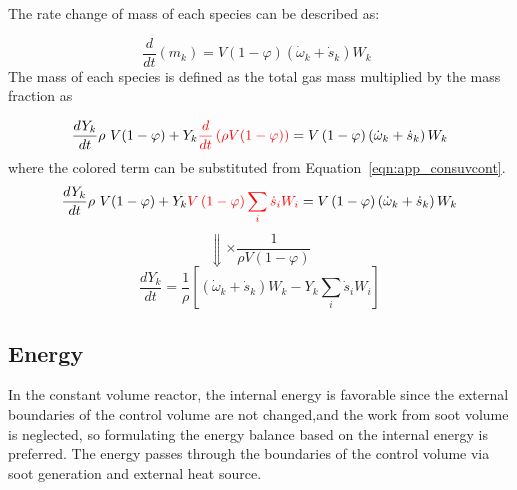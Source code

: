 The rate change of mass of each species can be described as:

\begin{equation*}
	\frac{d}{dt}\left(m_k\right)=V\left(1-\varphi\right)\left({\dot{\omega}}_k+{\dot{s}}_k\right)W_k\ \ 
\end{equation*}
The mass of each species is defined as the total gas mass multiplied by the mass fraction as

\begin{equation*}
	\frac{dY_k}{dt}\rho\ V(1-\varphi)
	+
	Y_k\color{red}{\frac{d}{dt}\left(\rho V(1-\varphi)\right)}
	\color{black}
	=
	V\left(1-\varphi\right)\left({\dot{\omega}}_k+{\dot{s}}_k\right)W_k
\end{equation*}
where the colored term can be substituted from Equation~\eqref{eqn:app_consuvcont}.
\begin{equation*}
	\frac{dY_k}{dt}\rho\ V(1-\varphi)
	+
	Y_k\color{red}{V\left(1-\varphi\right)\sum_{i}{{\dot{s}}_iW_i}}
	\color{black}
	=
	V\left(1-\varphi\right)\left({\dot{\omega}}_k+{\dot{s}}_k\right)W_k
\end{equation*}
\begin{equation*}
	\Downarrow \times \frac{1}{\rho V (1-\varphi)}
\end{equation*}
\begin{equation}
	\frac{dY_k}{dt}
	=
	\frac{1}{\rho}
	\left[
		\left({\dot{\omega}}_k+{\dot{s}}_k\right)W_k
		-Y_k{\sum_{i}{{\dot{s}}_iW_i}}
	\right]
	\label{eqn:app_speciesconstuv}
\end{equation}

\subsection{Energy}
In the constant volume reactor, the internal energy is favorable since the external boundaries of the control volume are not changed,and the work from soot volume is neglected, so formulating the energy balance based on the internal energy is preferred. 
The energy passes through the boundaries of the control volume via soot generation and external heat source.

